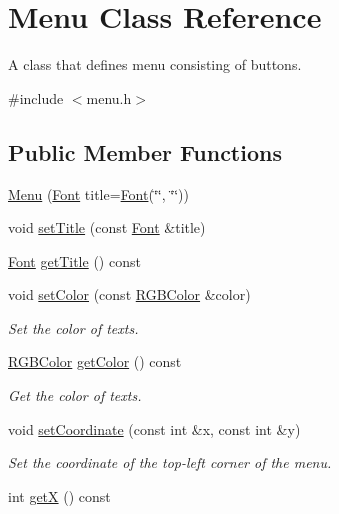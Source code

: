 \hypertarget{class_menu}{}\section{Menu Class Reference}
\label{class_menu}


A class that defines menu consisting of buttons.  




{\ttfamily \#include $<$menu.\+h$>$}

\subsection*{Public Member Functions}
\begin{DoxyCompactItemize}
\item 
\mbox{\hyperlink{class_menu_af2baf3084bfc956b6727558008e7f5a0}{Menu}} (\mbox{\hyperlink{class_font}{Font}} title=\mbox{\hyperlink{class_font}{Font}}(\char`\"{}\char`\"{}, \char`\"{}\char`\"{}))
\item 
void \mbox{\hyperlink{class_menu_a5ec641fded3a140c8a5522ad689a301c}{set\+Title}} (const \mbox{\hyperlink{class_font}{Font}} \&title)
\item 
\mbox{\hyperlink{class_font}{Font}} \mbox{\hyperlink{class_menu_a5e5ab9761f37464740171acef5f53ad6}{get\+Title}} () const
\item 
void \mbox{\hyperlink{class_menu_a5e8e5869de44c9c592780bbebed30be5}{set\+Color}} (const \mbox{\hyperlink{class_r_g_b_color}{R\+G\+B\+Color}} \&color)
\begin{DoxyCompactList}\small\item\em Set the color of texts. \end{DoxyCompactList}\item 
\mbox{\hyperlink{class_r_g_b_color}{R\+G\+B\+Color}} \mbox{\hyperlink{class_menu_af5046c732ceebbb3fc86b42f79d55873}{get\+Color}} () const
\begin{DoxyCompactList}\small\item\em Get the color of texts. \end{DoxyCompactList}\item 
void \mbox{\hyperlink{class_menu_a27d7e75ca0a6d80e9a8c299d858f5dc3}{set\+Coordinate}} (const int \&x, const int \&y)
\begin{DoxyCompactList}\small\item\em Set the coordinate of the top-\/left corner of the menu. \end{DoxyCompactList}\item 
int \mbox{\hyperlink{class_menu_a75345bb25315b3cbcc98ad276e043f4d}{getX}} () const

\end{DoxyCompactItemize}
